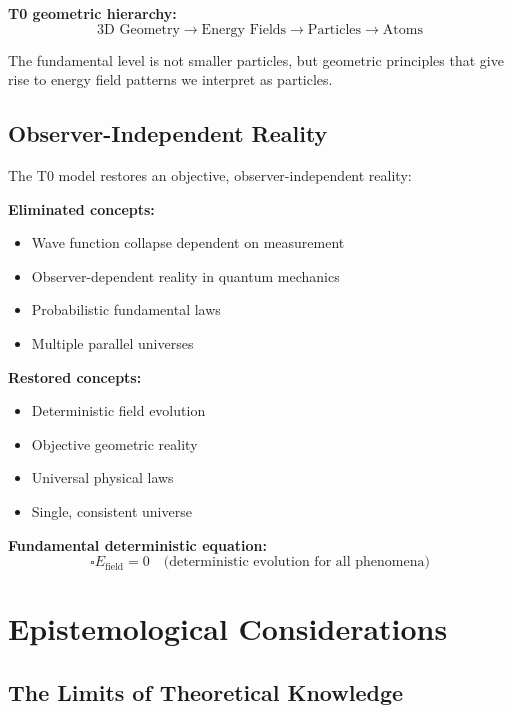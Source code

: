 \documentclass[12pt,a4paper]{report}
\begin{document}
\textbf{T0 geometric hierarchy:}
\begin{equation}
	\text{3D Geometry} \rightarrow \text{Energy Fields} \rightarrow \text{Particles} \rightarrow \text{Atoms}
\end{equation}

The fundamental level is not smaller particles, but geometric principles that give rise to energy field patterns we interpret as particles.

\subsection{Observer-Independent Reality}
\label{subsec:observer_independent_reality}

The T0 model restores an objective, observer-independent reality:

\textbf{Eliminated concepts:}
\begin{itemize}
	\item Wave function collapse dependent on measurement
	\item Observer-dependent reality in quantum mechanics
	\item Probabilistic fundamental laws
	\item Multiple parallel universes
\end{itemize}

\textbf{Restored concepts:}
\begin{itemize}
	\item Deterministic field evolution
	\item Objective geometric reality
	\item Universal physical laws
	\item Single, consistent universe
\end{itemize}

\textbf{Fundamental deterministic equation:}
\begin{equation}
	\square E_{\text{field}} = 0 \quad \text{(deterministic evolution for all phenomena)}
\end{equation}

\section{Epistemological Considerations}
\label{sec:epistemological_considerations}

\subsection{The Limits of Theoretical Knowledge}
\label{subsec:limits_theoretical_knowledge}
\end{document}
